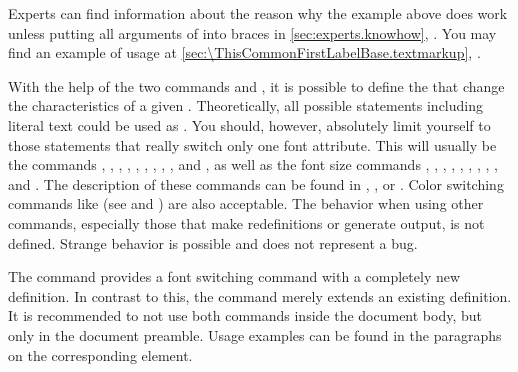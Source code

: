     \else %
      Experts can find information about the reason why the example above does
      work unless putting all arguments of  into braces in
      \autoref{sec:experts.knowhow},
      .%
    \fi
  \else
    You may find an example of usage at
    \autoref{sec:\ThisCommonFirstLabelBase.textmarkup},
    .
  \fi%
  \EndIndexGroup%
\fi


\begin{Declaration}
\end{Declaration}%
With the help of the two commands  and
, it is possible to define the  that
change the characteristics of a given . Theoretically, all
possible statements including literal text could be used as .
You should, however, absolutely limit yourself to those
statements that really switch only one font attribute. This will usually be
the commands , , ,
, , , ,
, , and , as well as the font
size commands , , , ,
, , , ,
, and . The description of these commands can be
found in \cite{lshort}, \cite{latex:usrguide}, or \cite{latex:fntguide}. Color
switching commands like  (see \cite{package:graphics} and
\cite{package:xcolor}) are also acceptable.  The behavior when using other
commands, especially those that make redefinitions or generate output, is not
defined. Strange behavior is possible and does not represent a bug.

The command  provides a font switching command with a
completely new definition. In contrast to this, the 
command merely extends an existing definition. It is recommended to not use
both commands inside the document body, but only in the document preamble.
Usage examples can be found in the paragraphs on the corresponding element.

